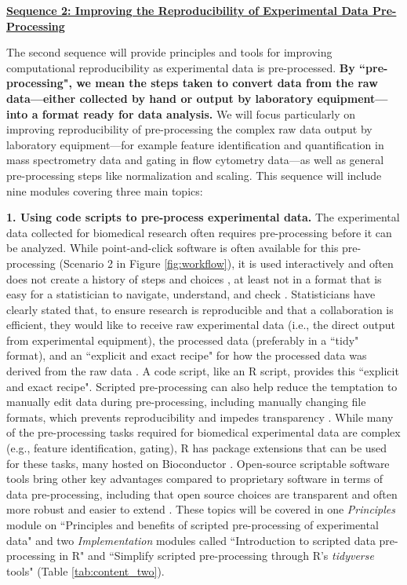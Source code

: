 \documentclass[pdftex,english,11.5pt,parskip=half]{scrartcl}
\begin{document}
\underline{\textbf{Sequence 2: Improving the Reproducibility of Experimental Data
Pre-Processing}}

The second sequence will provide principles and tools for improving
computational reproducibility as
experimental data is pre-processed. \textbf{By ``pre-processing", we mean the steps 
taken to convert data from the raw data---either collected by hand or output
by laboratory equipment---into a format ready for data analysis.} We will focus
particularly on improving reproducibility of pre-processing the complex 
raw data output by laboratory equipment---for example feature identification 
and quantification in mass spectrometry data and gating in flow cytometry data---as well
as general pre-processing steps like normalization and scaling. This sequence will include nine modules covering three main topics: 

\textbf{1. Using code scripts to pre-process experimental data.} The experimental data collected for biomedical research often requires 
pre-processing before it can be analyzed. While 
point-and-click software is often available for this pre-processing (Scenario 2 in Figure \ref*{fig:workflow}), it is used interactively and often does not create a history of steps and choices \cite{pernet2015improving}, at least not in a format that is easy for a statistician to navigate, understand, and check \cite{peng2011reproducible, pernet2015improving}. 
Statisticians have clearly stated that, to ensure research is reproducible and that a collaboration is efficient, they would like to receive raw experimental data (i.e., the direct output from experimental equipment), the processed data (preferably in a ``tidy" format), and an ``explicit and exact recipe" for how the processed data was derived from the raw data \cite{ellis2018share}.
A code script, like an R script, provides this ``explicit and exact recipe". Scripted pre-processing can also help reduce the temptation to manually edit data during pre-processing, including manually changing file formats, which prevents reproducibility and impedes transparency \cite{pernet2015improving}. While many of the pre-processing tasks required for biomedical experimental data are complex (e.g., feature identification, gating), R has package extensions that can be used for these tasks, many hosted on Bioconductor \cite{huber2015orchestrating}. 
Open-source scriptable
software tools bring other key advantages compared to proprietary software in terms of data
pre-processing, including that open source choices are transparent and often more robust and easier to extend \cite{cetinkaya2017infrastructure, huber2015orchestrating,
brown2014reproducible, piccolo2016tools, baumer2018lessons}. 
These topics will be covered in one
\textit{Principles} module on ``Principles and benefits of scripted
pre-processing of experimental data" and two \textit{Implementation} modules
called ``Introduction to scripted data pre-processing in R" and ``Simplify
scripted pre-processing through R's \textit{tidyverse} tools" (Table \ref*{tab:content_two}).
\end{document}
